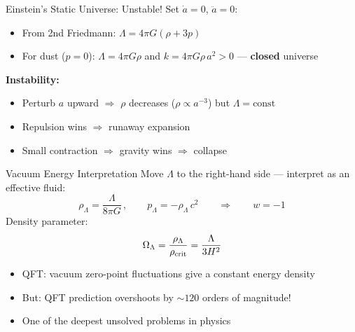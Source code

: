 \documentclass[aspectratio=169,11pt]{beamer}
\begin{document}
\begin{frame}{Einstein's Static Universe: \alert{Unstable!}}
Set $\dot{a}=0$, $\ddot{a}=0$:
\begin{itemize}
    \item From 2nd Friedmann: $\Lambda=4\pi G(\rho+3p)$
    \item For dust ($p=0$): $\Lambda=4\pi G\rho$ and $k=4\pi G\rho\,a^2>0$ --- \textbf{closed} universe
\end{itemize}
\vspace{0.3cm}
\textbf{Instability:}
\begin{itemize}
    \item Perturb $a$ upward $\Rightarrow$ $\rho$ decreases ($\rho\propto a^{-3}$) but $\Lambda=\text{const}$
    \item Repulsion wins $\Rightarrow$ runaway expansion
    \item Small contraction $\Rightarrow$ gravity wins $\Rightarrow$ collapse
\end{itemize}
\vspace{0.2cm}
\begin{center}
\end{center}
\end{frame}

\begin{frame}{Vacuum Energy Interpretation}
Move $\Lambda$ to the right-hand side --- interpret as an effective fluid:
\begin{equation*}
    \rho_\Lambda = \frac{\Lambda}{8\pi G}\,,\qquad
    p_\Lambda = -\rho_\Lambda\,c^2
    \qquad\Longrightarrow\qquad w=-1
\end{equation*}
Density parameter:
\begin{equation*}
    \Omega_\Lambda = \frac{\rho_\Lambda}{\rho_{\rm crit}} = \frac{\Lambda}{3H^2}
\end{equation*}
\begin{itemize}
    \item QFT: vacuum zero-point fluctuations give a constant energy density
    \item But: QFT prediction overshoots by $\sim120$ orders of magnitude!
    \item One of the deepest unsolved problems in physics
\end{itemize}
\end{frame}
\end{document}
